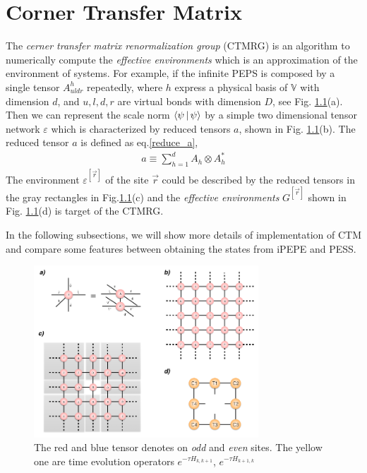 \chapter{Corner Transfer Matrix}
\label{chapter:ctm}
The \textit{cerner transfer matrix renormalization group} (CTMRG) \cite{} is an algorithm to numerically compute the \textit{effective environments} which is an approximation of the environment of systems. For example, if the infinite PEPS is composed by a single tensor $A^{h}_{uldr}$ repeatedly, where $h$ express a physical basis of  $\mathbb{V}$ with dimension $d$, and $u,l,d,r$ are virtual bonds with dimension $D$, see Fig. \ref{fig501}(a). Then we can represent the scale norm $\Braket{\psi|\psi}$ by a simple two dimensional tensor network $\varepsilon$ which is characterized by reduced tensors $a$, shown in Fig. \ref{fig501}(b). The reduced tensor $a$ is defined as eq.\ref{reduce_a}, 
\begin{align}
	\label{reduce_a}
	a \equiv \sum_{h=1}^{d} A_{h} \otimes A^{*}_{h}
\end{align}
The environment $\varepsilon^{[\vec{r}]}$ of the site $\vec{r}$ could be described by the reduced tensors in the gray rectangles in Fig.\ref{fig501}(c) and the \textit{effective environments} $G^{[\vec{r}]}$ shown in Fig. \ref{fig501}(d) is target of the CTMRG. 

In the following subsections, we will show more details of implementation of CTM and compare some features between obtaining the states from iPEPE and PESS.

\begin{figure}[ht]
	\centering
	\includegraphics[width=0.75\textwidth]{figures/fig501.png}
	\caption[The picture of the main idea of itebd.]{The red and blue tensor denotes on \textit{odd} and \textit{even} sites. The yellow one are time evolution operators $e^{-\tau H_{k,k+1}}$, $e^{-\tau H_{k+1,k}}$}
	\label{fig501}
\end{figure}

